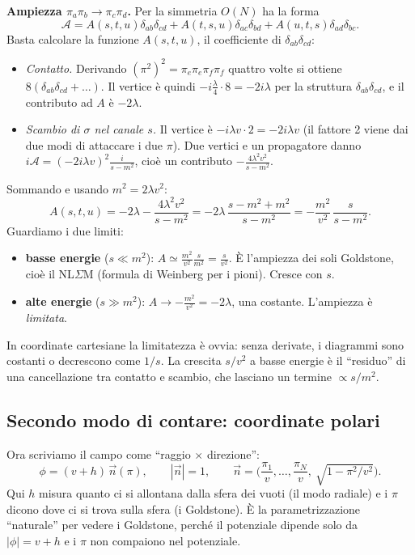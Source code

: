 \documentclass[11pt,a4paper]{article}
\numberwithin{equation}{section}
\theoremstyle{remark}
\begin{document}
\textbf{Ampiezza $\pi_a\pi_b\to\pi_c\pi_d$.} Per la simmetria $O(N)$ ha la forma
\[
\mathcal A=A(s,t,u)\delta_{ab}\delta_{cd}+A(t,s,u)\delta_{ac}\delta_{bd}+A(u,t,s)\delta_{ad}\delta_{bc}.
\] Basta calcolare la funzione $A(s,t,u)$, il coefficiente di $\delta_{ab}\delta_{cd}$:
\begin{itemize}
\item \emph{Contatto.} Derivando $(\pi^2)^2=\pi_e\pi_e\pi_f\pi_f$ quattro volte si ottiene $8(\delta_{ab}\delta_{cd}+\dots)$. Il vertice è quindi $-i\frac\lambda4\cdot8=-2i\lambda$ per la struttura $\delta_{ab}\delta_{cd}$, e il contributo ad $A$ è $-2\lambda$.
\item \emph{Scambio di $\sigma$ nel canale $s$.} Il vertice è $-i\lambda v\cdot2=-2i\lambda v$ (il fattore 2 viene dai due modi di attaccare i due $\pi$). Due vertici e un propagatore danno $i\mathcal A=(-2i\lambda v)^2\frac{i}{s-m^2}$, cioè un contributo $-\frac{4\lambda^2v^2}{s-m^2}$.
\end{itemize}
Sommando e usando $m^2=2\lambda v^2$:
\begin{equation}
A(s,t,u)=-2\lambda-\frac{4\lambda^2v^2}{s-m^2}=-2\lambda\,\frac{s-m^2+m^2}{s-m^2}=\boxed{-\frac{m^2}{v^2}\,\frac{s}{s-m^2}} .
\label{eq:toyA}
\end{equation}
Guardiamo i due limiti:
\begin{itemize}
\item \textbf{basse energie} ($s\ll m^2$): $A\simeq\frac{m^2}{v^2}\frac{s}{m^2}=\frac{s}{v^2}$. È l'ampiezza dei soli Goldstone, cioè il NL$\Sigma$M (formula di Weinberg per i pioni). Cresce con $s$.
\item \textbf{alte energie} ($s\gg m^2$): $A\to-\frac{m^2}{v^2}=-2\lambda$, una costante. L'ampiezza è \emph{limitata}.
\end{itemize}
In coordinate cartesiane la limitatezza è ovvia: senza derivate, i diagrammi sono costanti o decrescono come $1/s$. La crescita $s/v^2$ a basse energie è il ``residuo'' di una cancellazione tra contatto e scambio, che lasciano un termine $\propto s/m^2$.

\subsection{Secondo modo di contare: coordinate polari}

Ora scriviamo il campo come ``raggio $\times$ direzione'':
\[
\phi=(v+h)\,\vec n(\pi),\qquad |\vec n|=1,\qquad \vec n=\Big(\frac{\pi_1}{v},\dots,\frac{\pi_N}{v},\ \sqrt{1-\pi^2/v^2}\Big).
\]
Qui $h$ misura quanto ci si allontana dalla sfera dei vuoti (il modo radiale) e i $\pi$ dicono dove ci si trova sulla sfera (i Goldstone). È la parametrizzazione ``naturale'' per vedere i Goldstone, perché il potenziale dipende solo da $|\phi|=v+h$ e i $\pi$ non compaiono nel potenziale.
\end{document}

